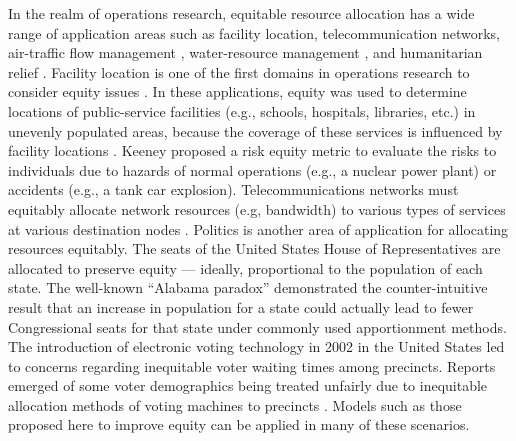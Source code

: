 In the realm of operations research, equitable resource allocation has a wide range of application areas \cite{luss1999equitable} such as facility location, telecommunication networks, air-traffic flow management \cite{bertsimas2011proposal, rios2007delay}, water-resource management \cite{brill1976equity}, and humanitarian relief \cite{beamon2008performance, campbell2008routing, huang2012models}. Facility location is one of the first domains in operations research to consider equity issues \cite{o1969model, mumphrey1971decision, mcallister1976equity, savas1978equity, marsh1994equity}. In these applications, equity was used to determine locations of public-service facilities (e.g., schools, hospitals, libraries, etc.) in unevenly populated areas, because the coverage of these services is influenced by facility locations \cite{coulter1980measuring, erkut1992multiobjective, ogryczak2009inequality}. Keeney \cite{keeney1980equity, keeney1980utility} proposed a risk equity metric to evaluate the risks to individuals due to hazards of normal operations (e.g., a nuclear power plant) or accidents (e.g., a tank car explosion). Telecommunications networks must equitably allocate network resources (e.g, bandwidth) to various types of services at various destination nodes \cite{luo2004packet, ogryczak2002equitable, ogryczak2005telecommunications, radunovic2004rate}. Politics is another area of application for allocating resources equitably. The seats of the United States House of Representatives are allocated to preserve equity — ideally, proportional to the population of each state. The well-known “Alabama paradox” \cite{balinski1983apportioning} demonstrated the counter-intuitive result that an increase in population for a state could actually lead to fewer Congressional seats for that state under commonly used apportionment methods. The introduction of electronic voting technology in 2002 in the United States led to concerns regarding inequitable voter waiting times among precincts. Reports emerged of some voter demographics being treated unfairly due to inequitable allocation methods of voting machines to precincts \cite{mcphee2006ritter, flaherty2008ohio, levine2008excitement}. Models such as those proposed here to improve equity can be applied in many of these scenarios.

